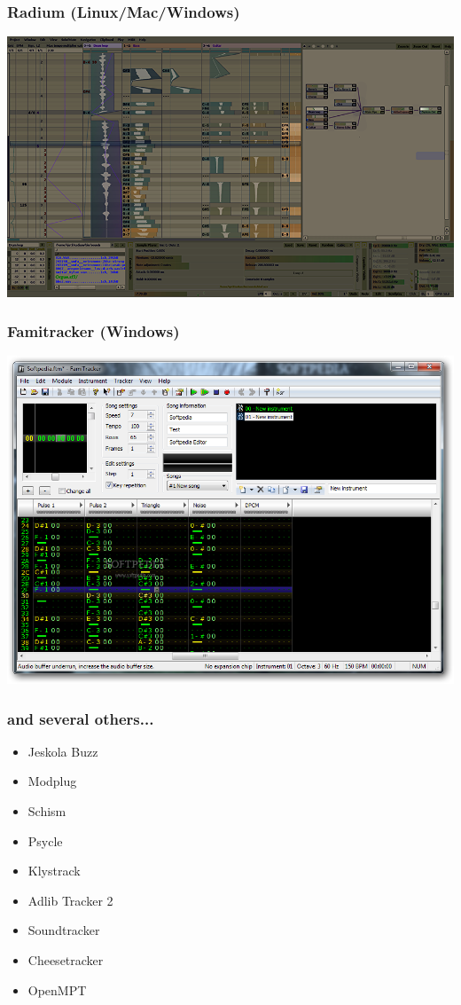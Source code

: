\documentclass{beamer}
\begin{document}
\begin{frame}
\frametitle{Radium (Linux/Mac/Windows)}
\begin{center}
\includegraphics[scale=0.3]{radium}
\end{center}
\end{frame}

\begin{frame}
\frametitle{Famitracker (Windows)}
\begin{center}
\includegraphics[scale=0.4]{famitracker}
\end{center}
\end{frame}

\begin{frame}
\frametitle{and several others...}
\begin{itemize}
    \item{Jeskola Buzz}
    \item{Modplug}
    \item{Schism}
    \item{Psycle}
    \item{Klystrack}
    \item{Adlib Tracker 2}
    \item{Soundtracker}
    \item{Cheesetracker}
    \item{OpenMPT}
\end{itemize}

\end{frame}
\end{document}
